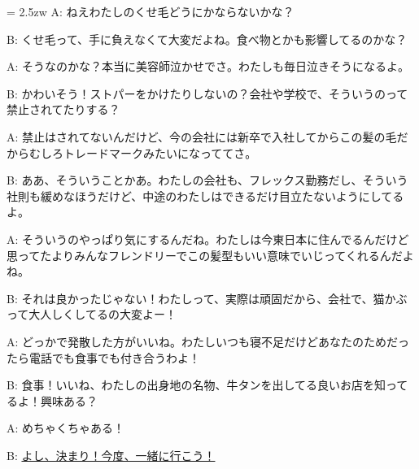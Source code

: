\documentclass[11pt]{amsart}
\title{}
\author{}
\newenvironment{hangall}[1]{\hangindent = 2.5zw\everypar{\hangindent = 2.5zw}}{}
\begin{document}
\maketitle
\begin{hangall}{}%
A: ねえわたしのくせ毛どうにかならないかな？

B: くせ毛って、手に負えなくて大変だよね。食べ物とかも影響してるのかな？

A: そうなのかな？本当に美容師泣かせでさ。わたしも毎日泣きそうになるよ。

B: かわいそう！ストパーをかけたりしないの？会社や学校で、そういうのって禁止されてたりする？

A: 禁止はされてないんだけど、今の会社には新卒で入社してからこの髪の毛だからむしろトレードマークみたいになっててさ。

B: ああ、そういうことかあ。わたしの会社も、フレックス勤務だし、そういう社則も緩めなほうだけど、中途のわたしはできるだけ目立たないようにしてるよ。

A: そういうのやっぱり気にするんだね。わたしは今東日本に住んでるんだけど思ってたよりみんなフレンドリーでこの髪型もいい意味でいじってくれるんだよね。

B: それは良かったじゃない！わたしって、実際は頑固だから、会社で、猫かぶって大人しくしてるの大変よー！

A: どっかで発散した方がいいね。わたしいつも寝不足だけどあなたのためだったら電話でも食事でも付き合うわよ！

B: 食事！いいね、わたしの出身地の名物、牛タンを出してる良いお店を知ってるよ！興味ある？

A: めちゃくちゃある！

B: \ul{よし、決まり！今度、一緒に行こう！}\end{hangall}
\end{document}
